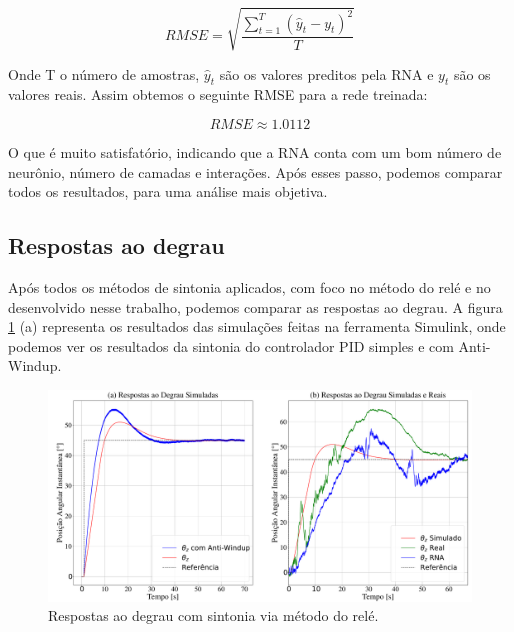 \begin{equation}
RMSE = \sqrt{\frac{\sum_{t=1}^{T}(\hat{y}_t-y_t)^2}{T}}
\end{equation}

Onde T o número de amostras, $\hat{y}_t$ são os valores preditos pela RNA e $y_t$ são os valores reais. Assim obtemos o seguinte RMSE para a rede treinada:

\begin{equation}
RMSE \approx 1.0112
\end{equation}

O que é muito satisfatório, indicando que a RNA conta com um bom número de neurônio, número de camadas e interações. Após esses passo, podemos comparar todos os resultados, para uma análise mais objetiva. 



\subsection{Respostas ao degrau}

Após todos os métodos de sintonia aplicados, com foco no método do relé e no desenvolvido nesse trabalho, podemos comparar as respostas ao degrau. A figura \ref{fig:pid_result} (a) representa os resultados das simulações feitas na ferramenta Simulink, onde podemos ver os resultados da sintonia do controlador PID simples e com Anti-Windup.

\begin{figure}[H]
  \caption{Respostas ao degrau com sintonia via método do relé.}
  \begin{center}
      \includegraphics[scale=0.25]{resultados/img/pid_result}
  \end{center}
  \label{fig:pid_result}
\end{figure}

